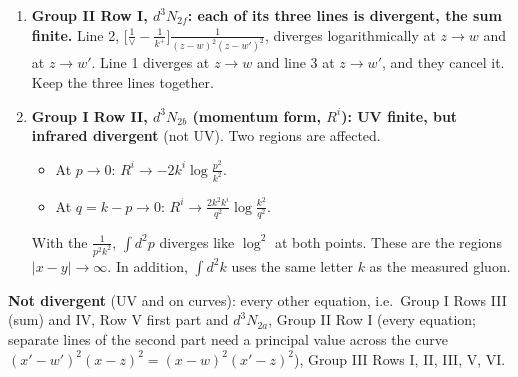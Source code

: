\documentclass[10pt]{article}
\begin{document}
\begin{center}
{\begin{minipage}{0.96\textwidth}
\begin{enumerate}
\item[\textbf{F4}] \textbf{Group II Row I, $d^3N_{2f}$: each of its three lines is divergent, the sum finite.} Line 2, $\big[\frac1\vee-\frac1{k^+}\big]\frac{1}{(z-w)^2(z-w')^2}$, diverges logarithmically at $z\to w$ and at $z\to w'$. Line 1 diverges at $z\to w$ and line 3 at $z\to w'$, and they cancel it. Keep the three lines together.
\item[\textbf{F5}] \textbf{Group I Row II, $d^3N_{2b}$ (momentum form, $R^i$): UV finite, but infrared divergent} (not UV). Two regions are affected.
\begin{itemize}
\item At $p\to0$: $R^i\to-2k^i\log\frac{p^2}{k^2}$.
\item At $q=k-p\to0$: $R^i\to\frac{2k^2k^i}{q^2}\log\frac{k^2}{q^2}$.
\end{itemize}
With the $\frac{1}{p^2k^2}$, $\int d^2p$ diverges like $\log^2$ at both points. These are the regions $|x-y|\to\infty$. In addition, $\int d^2k$ uses the same letter $k$ as the measured gluon.
\end{enumerate}
\textbf{Not divergent} (UV and on curves): every other equation, i.e.\ Group I Rows III (sum) and IV, Row V first part and $d^3N_{2a}$, Group II Row I (every equation; separate lines of the second part need a principal value across the curve $(x'-w')^2(x-z)^2=(x-w)^2(x'-z)^2$), Group III Rows I, II, III, V, VI.
\end{minipage}}\end{center}
\end{document}
